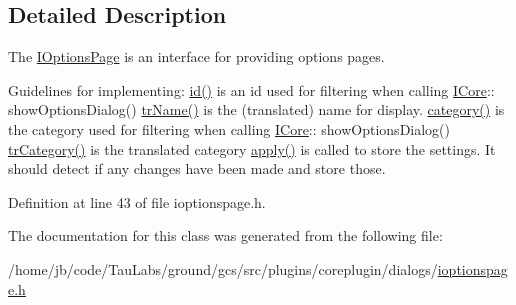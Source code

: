 \subsection{\-Detailed \-Description}
\-The \hyperlink{class_core_1_1_i_options_page}{\-I\-Options\-Page} is an interface for providing options pages. 

\-Guidelines for implementing\-:   \hyperlink{group___core_plugin_ga2984fb6ab0e3b502783dfee7ba596268}{id()} is an id used for filtering when calling \hyperlink{class_core_1_1_i_core}{\-I\-Core}\-:\-: show\-Options\-Dialog()  \hyperlink{group___core_plugin_ga9bda94026b37720a30f4294560c79244}{tr\-Name()} is the (translated) name for display.  \hyperlink{group___core_plugin_ga03767437394cdfbfc9e253638a71b132}{category()} is the category used for filtering when calling \hyperlink{class_core_1_1_i_core}{\-I\-Core}\-:\-: show\-Options\-Dialog()  \hyperlink{group___core_plugin_gac5538fc040c826784167edb4fc359b68}{tr\-Category()} is the translated category  \hyperlink{group___core_plugin_ga05fa0c9b91da02a0f2fed11d2d6afed0}{apply()} is called to store the settings. \-It should detect if any changes have been made and store those.  

\-Definition at line 43 of file ioptionspage.\-h.



\-The documentation for this class was generated from the following file\-:\begin{DoxyCompactItemize}
\item 
/home/jb/code/\-Tau\-Labs/ground/gcs/src/plugins/coreplugin/dialogs/\hyperlink{ioptionspage_8h}{ioptionspage.\-h}\end{DoxyCompactItemize}
